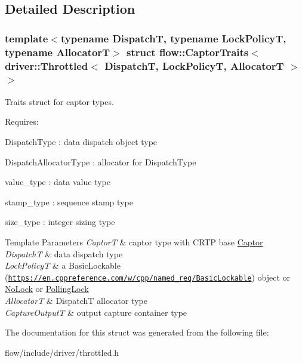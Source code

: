 \subsection{Detailed Description}
\subsubsection*{template$<$typename DispatchT, typename Lock\+PolicyT, typename AllocatorT$>$\newline
struct flow\+::\+Captor\+Traits$<$ driver\+::\+Throttled$<$ Dispatch\+T, Lock\+Policy\+T, Allocator\+T $>$ $>$}

Traits struct for captor types. 

Requires\+:
\begin{DoxyItemize}
\item {\ttfamily Dispatch\+Type} \+: data dispatch object type
\item {\ttfamily Dispatch\+Allocator\+Type} \+: allocator for {\ttfamily Dispatch\+Type}
\item {\ttfamily value\+\_\+type} \+: data value type
\item {\ttfamily stamp\+\_\+type} \+: sequence stamp type
\item {\ttfamily size\+\_\+type} \+: integer sizing type
\end{DoxyItemize}


\begin{DoxyTemplParams}{Template Parameters}
{\em CaptorT} & captor type with C\+R\+TP base {\ttfamily \hyperlink{classflow_1_1_captor}{Captor}}\\
\hline
{\em DispatchT} & data dispatch type \\
\hline
{\em Lock\+PolicyT} & a Basic\+Lockable (\href{https://en.cppreference.com/w/cpp/named_req/BasicLockable}{\tt https\+://en.\+cppreference.\+com/w/cpp/named\+\_\+req/\+Basic\+Lockable}) object or \hyperlink{structflow_1_1_no_lock}{No\+Lock} or \hyperlink{structflow_1_1_polling_lock}{Polling\+Lock} \\
\hline
{\em AllocatorT} & {\ttfamily DispatchT} allocator type \\
\hline
{\em Capture\+OutputT} & output capture container type \\
\hline
\end{DoxyTemplParams}


The documentation for this struct was generated from the following file\+:\begin{DoxyCompactItemize}
\item 
flow/include/driver/throttled.\+h\end{DoxyCompactItemize}
